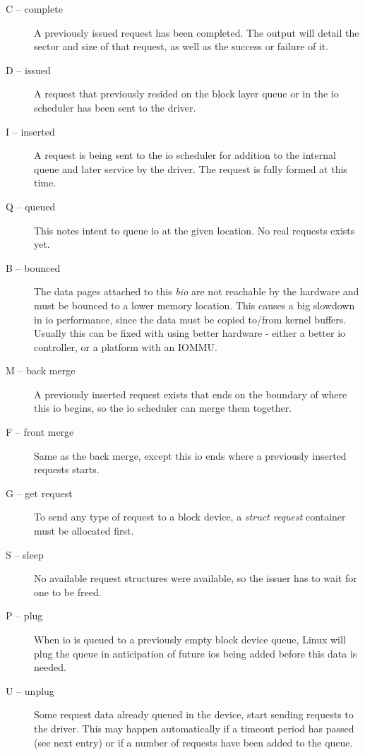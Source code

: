 \documentclass{article}
\begin{document}
\begin{description}
  \item[C -- complete] A previously issued request has been completed.
  The output will detail the sector and size of that request, as well
  as the success or failure of it.

  \item[D -- issued] A request that previously resided on the block layer
  queue or in the io scheduler has been sent to the driver.

  \item[I -- inserted] A request is being sent to the io scheduler for
  addition to the internal queue and later service by the driver. The
  request is fully formed at this time.

  \item[Q -- queued] This notes intent to queue io at the given location.
  No real requests exists yet.

  \item[B -- bounced] The data pages attached to this \emph{bio} are
  not reachable by the hardware and must be bounced to a lower memory
  location. This causes a big slowdown in io performance, since the data
  must be copied to/from kernel buffers. Usually this can be fixed with
  using better hardware - either a better io controller, or a platform
  with an IOMMU.

  \item[M -- back merge] A previously inserted request exists that ends
  on the boundary of where this io begins, so the io scheduler can merge
  them together.

  \item[F -- front merge] Same as the back merge, except this io ends
  where a previously inserted requests starts.

  \item[G -- get request] To send any type of request to a block device,
  a \emph{struct request} container must be allocated first.

  \item[S -- sleep] No available request structures were available, so
  the issuer has to wait for one to be freed.

  \item[P -- plug] When io is queued to a previously empty block device
  queue, Linux will plug the queue in anticipation of future ios being
  added before this data is needed.

  \item[U -- unplug] Some request data already queued in the device,
  start sending requests to the driver. This may happen automatically
  if a timeout period has passed (see next entry) or if a number of
  requests have been added to the queue.


\end{description}
\end{document}
